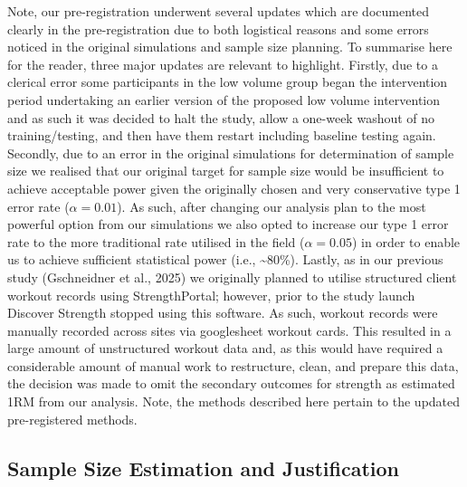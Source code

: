\documentclass[
]{article}
\begin{document}
Note, our pre-registration underwent several updates which are
documented clearly in the pre-registration due to both logistical
reasons and some errors noticed in the original simulations and sample
size planning. To summarise here for the reader, three major updates are
relevant to highlight. Firstly, due to a clerical error some
participants in the low volume group began the intervention period
undertaking an earlier version of the proposed low volume intervention
and as such it was decided to halt the study, allow a one-week washout
of no training/testing, and then have them restart including baseline
testing again. Secondly, due to an error in the original simulations for
determination of sample size we realised that our original target for
sample size would be insufficient to achieve acceptable power given the
originally chosen and very conservative type 1 error rate
(\(\alpha=0.01\)). As such, after changing our analysis plan to the most
powerful option from our simulations we also opted to increase our type
1 error rate to the more traditional rate utilised in the field
(\(\alpha=0.05\)) in order to enable us to achieve sufficient
statistical power (i.e., \textasciitilde80\%). Lastly, as in our
previous study (Gschneidner et al., 2025) we originally planned to
utilise structured client workout records using StrengthPortal; however,
prior to the study launch Discover Strength stopped using this software.
As such, workout records were manually recorded across sites via
googlesheet workout cards. This resulted in a large amount of
unstructured workout data and, as this would have required a
considerable amount of manual work to restructure, clean, and prepare
this data, the decision was made to omit the secondary outcomes for
strength as estimated 1RM from our analysis. Note, the methods described
here pertain to the updated pre-registered methods.

\subsection{Sample Size Estimation and
Justification}\label{sample-size-estimation-and-justification}
\end{document}
